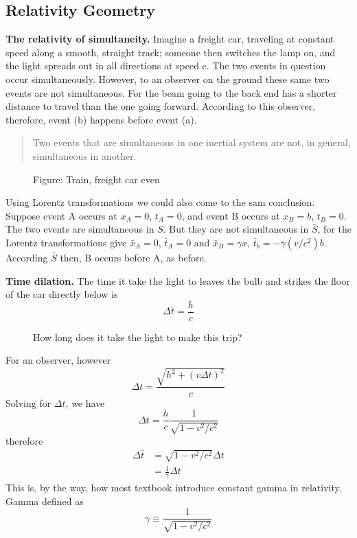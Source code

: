 \documentclass[../../../main.tex]{subfiles}
\begin{document}
\subsection{Relativity Geometry}
\textbf{The relativity of simultaneity.} Imagine a freight car, traveling at constant speed along a smooth, straight track; someone then switches the lamp on, and the light spreads out in all directions at speed c. The two events in question occur simultaneously. However, to an observer on the ground these same two events are not simultaneous. For the beam going to the back end has a shorter distance to travel than the one going forward. According to this observer, therefore, event (b) happens before event (a). 
\begin{quote}
    Two events that are simultaneous in one inertial system are not, in general, simultaneous in another.
\end{quote}
\begin{figure}[b]
    \centering
    \caption*{Figure: Train, freight car even}
\end{figure}
Using Lorentz transformations we could also come to the sam conclusion. Suppose event A occurs at $x_A = 0$, $t_A = 0$, and event B occurs at $x_B = b$, $t_B = 0$. The two events are simultaneous in $S$. But they are not simultaneous in $\bar{S}$, for the Lorentz transformations give $\bar{x}_A = 0$, $\bar{t}_A = 0$ and $\bar{x}_B = \gamma x$, $\bar{t}_b = -\gamma(v/c^2)b$. According $\bar{S}$ then, B occurs before A, as before.

\textbf{Time dilation.} The time it take the light to leaves the bulb and strikes the floor of the car directly below is
\begin{equation*}
    \Delta \bar{t}=\frac{h}{c}
\end{equation*}
\begin{figure}
    \centering
    \caption*{How long does it take the light to make this trip?}
\end{figure}
For an observer, however
\begin{equation*}
    \Delta t=\frac{\sqrt{h^2+(v\Delta t)^2}}{c}
\end{equation*}
Solving for $\Delta t$, we have
\begin{equation*}
    \Delta t=\frac{h}{c}\frac{1}{\sqrt{1-v^2/c^2}}
\end{equation*}
therefore
\begin{align*}
    \Delta \bar{t}&=\sqrt{1-v^2/c^2} \Delta t\\
    &=\frac{1}{\gamma} \Delta t
\end{align*}
This is, by the way, how most textbook introduce constant gamma in relativity. Gamma defined as 
\begin{equation*}
    \gamma\equiv\frac{1}{\sqrt{1-v^2/c^2}}
\end{equation*}
\end{document}
